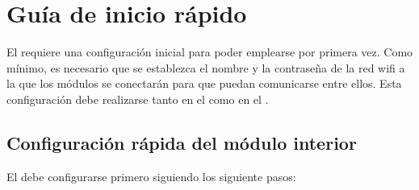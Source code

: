 \section{Guía de inicio rápido}
\label{sec:inicio-rapido}

El \CMS requiere una configuración inicial para poder emplearse por primera vez.
Como mínimo, es necesario que se establezca el nombre y la contraseña de la red wifi a la que los módulos se conectarán para que puedan comunicarse entre ellos.
Esta configuración debe realizarse tanto en el \MIE como en el \MEE.

\subsection{Configuración rápida del módulo interior}

El \MIE debe configurarse primero siguiendo los siguiente pasos:


